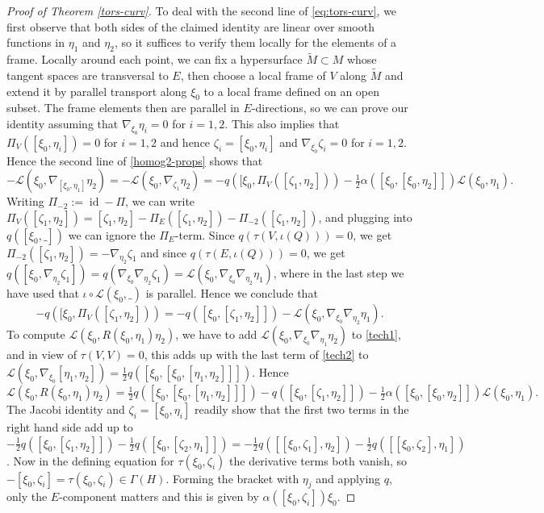 \documentclass[11pt]{amsart}
\newcommand{\id}{\operatorname{id}}
\numberwithin{proposition}{section}
\numberwithin{equation}{section}
\begin{document}
\begin{proof}[Proof of Theorem \ref{tors-curv}]
    To deal with the second line of \eqref{eq:tors-curv}, we first observe that both sides of the claimed identity are linear over smooth functions in $\eta_1$ and $\eta_2$, so it suffices to verify them locally for the elements of a frame. Locally around each point, we can fix a hypersurface $\tilde M\subset M$ whose tangent spaces are transversal to $E$, then choose a local frame of $V$ along $\tilde M$ and extend it by parallel transport along $\xi_0$ to a local frame defined on an open subset. The frame elements then are parallel in $E$-directions, so we can prove our identity assuming that $\nabla_{\xi_0}\eta_i=0$ for $i=1,2$. This also implies that $\Pi_V([\xi_0,\eta_i])=0$ for $i=1,2$ and hence $\zeta_i=[\xi_0,\eta_i]$ and $\nabla_{\xi_0}\zeta_i=0$ for $i=1,2$. Hence the second line of \eqref{homog2-props} shows that 
    \begin{equation}\label{tech1}
    -\mathcal L(\xi_0,\nabla_{[\xi_0,\eta_1]}\eta_2)=-\mathcal L(\xi_0,\nabla_{\zeta_1}\eta_2)=-q([\xi_0,\Pi_V([\zeta_1,\eta_2]))-\tfrac12\alpha([\xi_0,[\xi_0,\eta_2]])\mathcal L(\xi_0,\eta_1). 
    \end{equation}
    Writing $\Pi_{-2}:=\id-\Pi$, we can write $\Pi_V([\zeta_1,\eta_2])=[\zeta_1,\eta_2]-\Pi_E([\zeta_1,\eta_2])-\Pi_{-2}([\zeta_1,\eta_2])$, and plugging into $q([\xi_0,\_])$ we can ignore the $\Pi_E$-term. Since $q(\tau(V,\iota(Q)))=0$, we get $\Pi_{-2}([\zeta_1,\eta_2])=-\nabla_{\eta_2}\zeta_1$ and since $q(\tau(E,\iota(Q)))=0$, we get $q([\xi_0,\nabla_{\eta_2}\zeta_1])=q(\nabla_{\xi_0}\nabla_{\eta_2}\zeta_1)=\mathcal L(\xi_0,\nabla_{\xi_0}\nabla_{\eta_2}\eta_1)$, where in the last step we have used that $\iota\circ \mathcal L(\xi_0,\_)$ is parallel. Hence we conclude that 
    \begin{equation}\label{tech2}
      -q([\xi_0,\Pi_V([\zeta_1,\eta_2]))=-q([\xi_0,[\zeta_1,\eta_2]])-\mathcal L(\xi_0,\nabla_{\xi_0}\nabla_{\eta_2}\eta_1). 
    \end{equation}
    To compute $\mathcal L(\xi_0,R(\xi_0,\eta_1)\eta_2)$, we have to add $\mathcal L(\xi_0,\nabla_{\xi_0}\nabla_{\eta_1}\eta_2)$ to \eqref{tech1}, and in view of $\tau(V,V)=0$, this adds up with the last term of \eqref{tech2} to $\mathcal L(\xi_0,\nabla_{\xi_0}[\eta_1,\eta_2])=\tfrac12q([\xi_0,[\xi_0,[\eta_1,\eta_2]]])$. Hence 
    \begin{equation}\label{tech3}
      \mathcal L(\xi_0,R(\xi_0,\eta_1)\eta_2)=\tfrac12q([\xi_0,[\xi_0,[\eta_1,\eta_2]]])-q([\xi_0,[\zeta_1,\eta_2]]) -\tfrac12\alpha([\xi_0,[\xi_0,\eta_2]])\mathcal L(\xi_0,\eta_1).
    \end{equation}
    The Jacobi identity and $\zeta_i=[\xi_0,\eta_i]$ readily show that the first two terms in the right hand side add up to $-\frac12 q([\xi_0,[\zeta_1,\eta_2]])-\frac12q([\xi_0,[\zeta_2,\eta_1]])=-\frac12 q([[\xi_0,\zeta_1],\eta_2])-\frac12q([[\xi_0,\zeta_2],\eta_1])$. Now in the defining equation for $\tau(\xi_0,\zeta_i)$ the derivative terms both vanish, so $-[\xi_0,\zeta_i]=\tau(\xi_0,\zeta_i)\in\Gamma(H)$. Forming the bracket with $\eta_j$ and applying $q$, only the $E$-component matters and this is given by $\alpha([\xi_0,\zeta_i])\xi_0$.  
\end{proof}    
\end{document}

